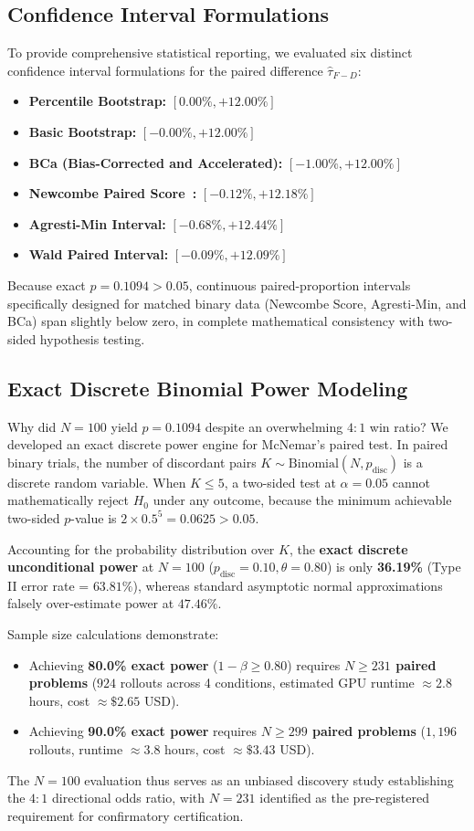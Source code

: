\documentclass[11pt]{article}
\begin{document}
\subsection{Confidence Interval Formulations}
To provide comprehensive statistical reporting, we evaluated six distinct confidence interval formulations for the paired difference $\hat{\tau}_{F-D}$:
\begin{itemize}
    \item \textbf{Percentile Bootstrap:} $[0.00\%, +12.00\%]$
    \item \textbf{Basic Bootstrap:} $[-0.00\%, +12.00\%]$
    \item \textbf{BCa (Bias-Corrected and Accelerated):} $[-1.00\%, +12.00\%]$
    \item \textbf{Newcombe Paired Score~\cite{Newcombe1998Improved}:} $[-0.12\%, +12.18\%]$
    \item \textbf{Agresti-Min Interval:} $[-0.68\%, +12.44\%]$
    \item \textbf{Wald Paired Interval:} $[-0.09\%, +12.09\%]$
\end{itemize}
Because exact $p = 0.1094 > 0.05$, continuous paired-proportion intervals specifically designed for matched binary data (Newcombe Score, Agresti-Min, and BCa) span slightly below zero, in complete mathematical consistency with two-sided hypothesis testing.

\subsection{Exact Discrete Binomial Power Modeling}
Why did $N=100$ yield $p = 0.1094$ despite an overwhelming $4:1$ win ratio? We developed an exact discrete power engine for McNemar's paired test. In paired binary trials, the number of discordant pairs $K \sim \text{Binomial}(N, p_{\text{disc}})$ is a discrete random variable. When $K \le 5$, a two-sided test at $\alpha = 0.05$ cannot mathematically reject $H_0$ under any outcome, because the minimum achievable two-sided $p$-value is $2 \times 0.5^5 = 0.0625 > 0.05$.

Accounting for the probability distribution over $K$, the \textbf{exact discrete unconditional power} at $N=100$ ($p_{\text{disc}} = 0.10, \theta = 0.80$) is only \textbf{36.19\%} (Type II error rate = $63.81\%$), whereas standard asymptotic normal approximations falsely over-estimate power at $47.46\%$. 

Sample size calculations demonstrate:
\begin{itemize}
    \item Achieving \textbf{80.0\% exact power} ($1 - \beta \ge 0.80$) requires \textbf{$N \ge 231$ paired problems} ($924$ rollouts across 4 conditions, estimated GPU runtime $\approx 2.8$ hours, cost $\approx \$2.65$ USD).
    \item Achieving \textbf{90.0\% exact power} requires \textbf{$N \ge 299$ paired problems} ($1,196$ rollouts, runtime $\approx 3.8$ hours, cost $\approx \$3.43$ USD).
\end{itemize}
The $N=100$ evaluation thus serves as an unbiased discovery study establishing the $4:1$ directional odds ratio, with $N=231$ identified as the pre-registered requirement for confirmatory certification.
\end{document}
